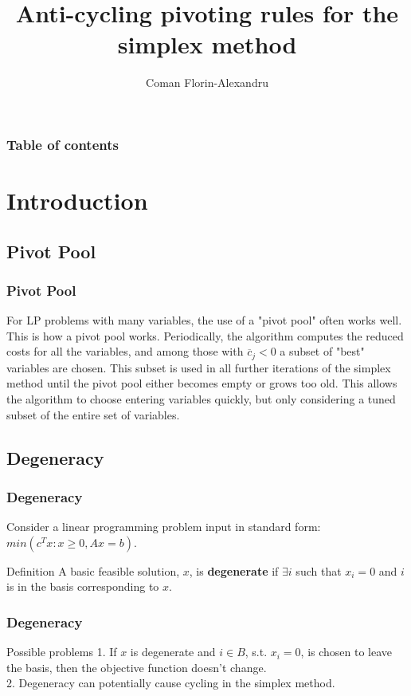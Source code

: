 \documentclass{beamer}
\begin{document}
\title{Anti-cycling pivoting rules for the simplex method}  
\author{Coman Florin-Alexandru}

\begin{frame}
\titlepage
\end{frame}

\begin{frame}\frametitle{Table of contents}\tableofcontents
\end{frame}

\section{Introduction}
\subsection{Pivot Pool}
\begin{frame}\frametitle{Pivot Pool}
\begin{block}{}
For LP problems with many variables, the use of a "pivot pool" often works well. This is how a pivot pool works. Periodically, the algorithm computes the reduced costs for all the variables, and among those with $\overline{c}_j < 0$ a subset of "best" variables are chosen. This subset is used in all further iterations of the simplex method until the pivot pool either becomes empty or grows too old. This allows the algorithm to choose entering variables quickly, but only considering a tuned subset of the entire set of variables.
\end{block}
\end{frame}

\subsection{Degeneracy}
\begin{frame}\frametitle{Degeneracy}
\begin{block}{}
Consider a linear programming problem input in standard form: $min(c^T x : x \geq 0, A x = b)$.
\end{block}
\begin{block}{Definition}
A basic feasible solution, $x$, is \textbf{degenerate} if $\exists i$ such that $x_i = 0$ and $i$ is in the basis corresponding to $x$.
\end{block}
\end{frame}

\begin{frame}\frametitle{Degeneracy}
\begin{block}{Possible problems}
1. If $x$ is degenerate and $i \in B$, s.t. $x_i = 0$, is chosen to leave the basis, then the objective function doesn’t change. \\
2. Degeneracy can potentially cause cycling in the simplex method.
\end{block}
\end{frame}
\end{document}
